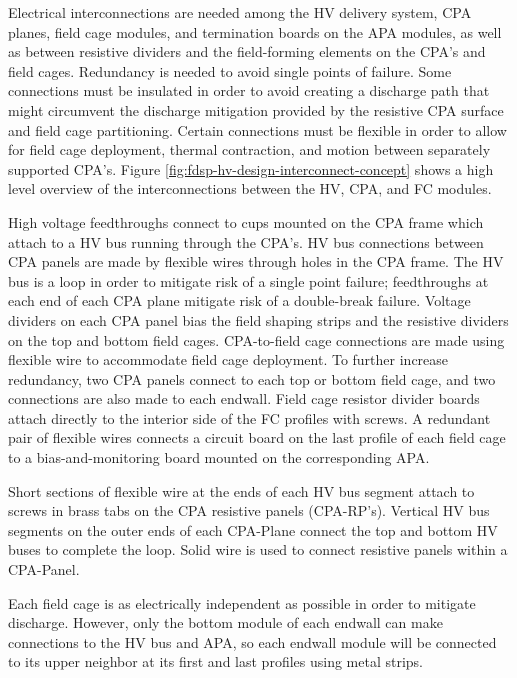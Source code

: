 Electrical interconnections are needed among the HV delivery system, CPA planes, field cage modules, and termination
boards on the APA modules, as well as between resistive dividers and
the field-forming elements on the CPA's and field cages.  Redundancy is
needed to avoid single points of failure.  Some connections must be
insulated in order to avoid creating a discharge path that might
circumvent the discharge mitigation provided by the resistive CPA
surface and field cage partitioning.  Certain connections must be
flexible in order to allow for field cage deployment, thermal
contraction, and motion between separately supported CPA's.  Figure
\ref{fig:fdsp-hv-design-interconnect-concept} shows a high level
overview of the interconnections between the HV, CPA, and FC modules.


High voltage feedthroughs connect to cups mounted on the CPA frame
which attach to a HV bus running through the CPA's.  HV bus connections
between CPA panels are made by flexible wires through holes in the
CPA frame. The HV bus is a loop in order to mitigate risk of a single
point failure; feedthroughs at each end of each CPA plane mitigate
risk of a double-break failure.  Voltage dividers on each CPA panel
bias the field shaping strips and the resistive dividers on the top
and bottom field cages.  CPA-to-field cage connections are made using
flexible wire to accommodate field cage deployment.  To further
increase redundancy, two CPA panels connect to each top or bottom
field cage, and two connections are also made to each endwall.  Field
cage resistor divider boards attach directly to the interior side of
the FC profiles with screws.  A redundant pair of flexible wires
connects a circuit board on the last profile of each field cage to a
bias-and-monitoring board mounted on the corresponding APA.

Short sections of flexible wire at the ends of each HV bus segment
attach to screws in brass tabs on the CPA resistive panels (CPA-RP's).
Vertical HV bus segments on the outer ends of each CPA-Plane connect
the top and bottom HV buses to complete the loop.  Solid wire is used
to connect resistive panels within a CPA-Panel.

Each field cage is as electrically independent as possible in order to
mitigate discharge.  However, only the bottom module of each endwall
can make connections to the HV bus and APA, so each endwall module
will be connected to its upper neighbor at its first and last profiles
using metal strips.

